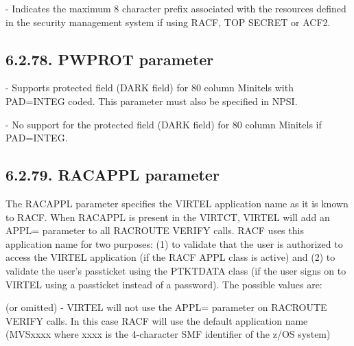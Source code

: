 \documentclass[letterpaper,10pt,english]{sphinxmanual}
\begin{document}
 - Indicates the maximum 8 character prefix associated with the resources defined in the security management system if using RACF, TOP SECRET or ACF2.


\subsection{6.2.78. PWPROT parameter}
\label{\detokenize{Installation_Guide:pwprot-parameter}}
\begin{sphinxVerbatim}[commandchars=\\\{\}]
 
\end{sphinxVerbatim}

 - Supports protected field (DARK field) for 80 column Minitels with PAD=INTEG coded. This parameter must also be specified in NPSI.

 - No support for the protected field (DARK field) for 80 column Minitels if PAD=INTEG.


\subsection{6.2.79. RACAPPL parameter}
\label{\detokenize{Installation_Guide:racappl-parameter}}
\begin{sphinxVerbatim}[commandchars=\\\{\}]
 
\end{sphinxVerbatim}

The RACAPPL parameter specifies the VIRTEL application name as it is known to RACF. When RACAPPL is present in the VIRTCT, VIRTEL will add an APPL= parameter to all RACROUTE VERIFY calls. RACF uses this application name for two purposes: (1) to validate that the user is authorized to access the VIRTEL application (if the RACF APPL class is active) and (2) to validate the user’s passticket using the PTKTDATA class (if the user signs on to VIRTEL using a passticket instead of a password). The possible values are:

 (or omitted) - VIRTEL will not use the APPL= parameter on RACROUTE VERIFY calls. In this case RACF will use the default application name (MVSxxxx where xxxx is the 4-character SMF identifier of the z/OS system)
\end{document}
